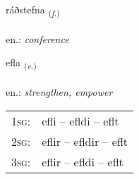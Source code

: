 \documentclass[frontgrid, backgrid]{flacards}\usepackage[]{graphicx}\usepackage[]{xcolor}
\begin{document}
\renewcommand{\flhead}{\vskip5pt \fboxsep=0pt {\small\bfseries\footnotesize Nafnorð | Noun}}
\renewcommand{\fcfoot}{\vskip5pt \fboxsep=0pt \hspace{2pt}{\small\bfseries\footnotesize 1K}}

\renewcommand{\blhead}{\vskip5pt {\small\bfseries\footnotesize Nafnorð | Noun }}
\renewcommand{\bcfoot}{\vskip5pt \hspace{2pt}{\small\bfseries\footnotesize 1K}}


{ráðstefna \small{\textsubscript{(\textit{f.})}} \\[1ex] %
\textphonetic{[rauðstɛpna]} \\
en.: \emph{conference} \\  [2ex]
\renewcommand*{\arraystretch}{0.8}
}

\renewcommand{\flhead}{\vskip5pt \fboxsep=0pt {\small\bfseries\footnotesize Sagnorð | Verb}}
\renewcommand{\fcfoot}{\vskip5pt \fboxsep=0pt \hspace{2pt}{\small\bfseries\footnotesize 1K}}

\renewcommand{\blhead}{\vskip5pt {\small\bfseries\footnotesize Sagnorð | Verb }}
\renewcommand{\bcfoot}{\vskip5pt \hspace{2pt}{\small\bfseries\footnotesize 1K}}


{efla \small{\textsubscript{(\textit{v.})}} \\[1ex] %
\textphonetic{[ɛpla]} \\
en.: \emph{strengthen, empower} \\  [2ex]
\renewcommand*{\arraystretch}{0.8}
\begin{tabular}{p{1cm}l}
\textsc{1sg}: & efli -- efldi -- eflt \\ 
\textsc{2sg}: & eflir -- efldir -- eflt \\ 
\textsc{3sg}: & eflir -- efldi -- eflt \\ 
\end{tabular}
}
\end{document}
